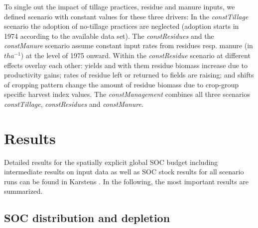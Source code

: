 \documentclass[gc, manuscript]{copernicus}
\begin{document}
To single out the impact of tillage practices, residue and manure inputs, we defined scenario with constant values for these three drivers: In the \textit{constTillage} scenario the adoption of no-tillage practices are neglected (adoption starts in 1974 according to the available data set). The \textit{constResidues} and the \textit{constManure} scenario assume constant input rates from residues resp. manure (in \(\unit{t ha^{-1}}\)) at the level of 1975 onward. Within the \textit{constResidue} scenario at different effects overlay each other: yields and with them residue biomass increase due to productivity gains; rates of residue left or returned to fields are raising; and shifts of cropping pattern change the amount of residue biomass due to crop-group specific harvest index values. The \textit{constManagement} combines all three scenarios \textit{constTillage}, \textit{constResidues} and \textit{constManure}.
\newpage

\hypertarget{results}{%
\section{Results}\label{results}}

Detailed results for the spatially explicit global SOC budget including intermediate results on input data as well as SOC stock results for all scenario runs can be found in Karstens \citeyearpar{karstens_model_2020}. In the following, the most important results \citep[see][ for post-processing script]{karstens_result_2020} are summarized.

\hypertarget{soc-distribution-and-depletion}{%
\subsection{SOC distribution and depletion}\label{soc-distribution-and-depletion}}
\end{document}
